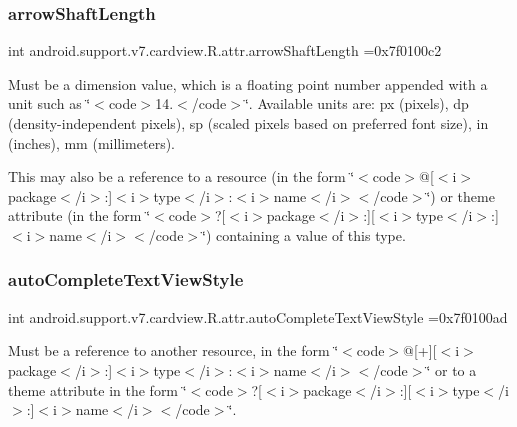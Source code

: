 \subsubsection{\texorpdfstring{arrow\+Shaft\+Length}{arrowShaftLength}}
{\footnotesize\ttfamily int android.\+support.\+v7.\+cardview.\+R.\+attr.\+arrow\+Shaft\+Length =0x7f0100c2\hspace{0.3cm}{\ttfamily [static]}}

Must be a dimension value, which is a floating point number appended with a unit such as \char`\"{}$<$code$>$14.\+5sp$<$/code$>$\char`\"{}. Available units are\+: px (pixels), dp (density-\/independent pixels), sp (scaled pixels based on preferred font size), in (inches), mm (millimeters). 

This may also be a reference to a resource (in the form \char`\"{}$<$code$>$@\mbox{[}$<$i$>$package$<$/i$>$\+:\mbox{]}$<$i$>$type$<$/i$>$\+:$<$i$>$name$<$/i$>$$<$/code$>$\char`\"{}) or theme attribute (in the form \char`\"{}$<$code$>$?\mbox{[}$<$i$>$package$<$/i$>$\+:\mbox{]}\mbox{[}$<$i$>$type$<$/i$>$\+:\mbox{]}$<$i$>$name$<$/i$>$$<$/code$>$\char`\"{}) containing a value of this type. \mbox{\label{classandroid_1_1support_1_1v7_1_1cardview_1_1R_1_1attr_aa1e3d978cb321b0ef0b2e958b7c0c4b9}} 
\subsubsection{\texorpdfstring{auto\+Complete\+Text\+View\+Style}{autoCompleteTextViewStyle}}
{\footnotesize\ttfamily int android.\+support.\+v7.\+cardview.\+R.\+attr.\+auto\+Complete\+Text\+View\+Style =0x7f0100ad\hspace{0.3cm}{\ttfamily [static]}}

Must be a reference to another resource, in the form \char`\"{}$<$code$>$@\mbox{[}+\mbox{]}\mbox{[}$<$i$>$package$<$/i$>$\+:\mbox{]}$<$i$>$type$<$/i$>$\+:$<$i$>$name$<$/i$>$$<$/code$>$\char`\"{} or to a theme attribute in the form \char`\"{}$<$code$>$?\mbox{[}$<$i$>$package$<$/i$>$\+:\mbox{]}\mbox{[}$<$i$>$type$<$/i$>$\+:\mbox{]}$<$i$>$name$<$/i$>$$<$/code$>$\char`\"{}. \mbox{\label{classandroid_1_1support_1_1v7_1_1cardview_1_1R_1_1attr_a2c3c88c05e2e1f352d9729fda30281ac}} 
